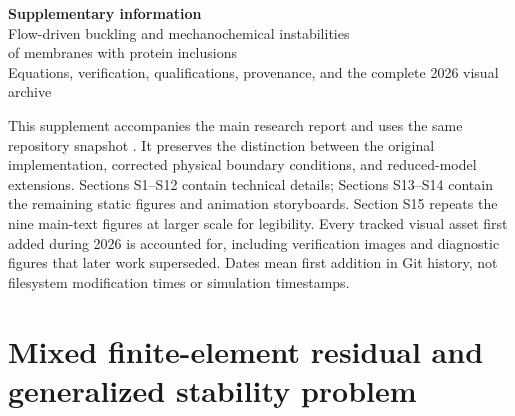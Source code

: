 
\renewcommand{\thesection}{S\arabic{section}}
\renewcommand{\theequation}{S\arabic{equation}}
\renewcommand{\thefigure}{S\arabic{figure}}
\renewcommand{\thetable}{S\arabic{table}}

\begin{center}
{\LARGE\bfseries Supplementary information}\\[7pt]
{\large Flow-driven buckling and mechanochemical instabilities\\ of membranes with protein inclusions}\\[6pt]
{\small Equations, verification, qualifications, provenance, and the complete 2026 visual archive}
\end{center}
This supplement accompanies the main research report and uses the same repository snapshot \cite{repo}. It preserves the distinction between the original implementation, corrected physical boundary conditions, and reduced-model extensions. Sections S1--S12 contain technical details; Sections S13--S14 contain the remaining static figures and animation storyboards. Section S15 repeats the nine main-text figures at larger scale for legibility. Every tracked visual asset first added during 2026 is accounted for, including verification images and diagnostic figures that later work superseded. Dates mean first addition in Git history, not filesystem modification times or simulation timestamps.

\makeatletter
\renewcommand*\l@section{\@dottedtocline{1}{0em}{2.7em}}
\renewcommand*\l@subsection{\@dottedtocline{2}{2.7em}{3em}}
\makeatother
\tableofcontents
\clearpage
\section{Mixed finite-element residual and generalized stability problem}
